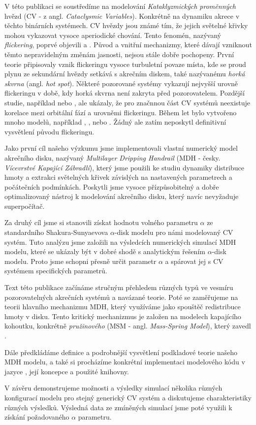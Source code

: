 V této publikaci se soustředíme na modelování \emph{Kataklyzmických proměnných} hvězd (CV - z angl. \emph{Cataclysmic Variables}). Konkrétně na dynamiku akrece v těchto binárních systémech. CV hvězdy jsou známé tím, že jejich světelné křivky mohou vykazovat vysoce aperiodické chování. Tento fenomén, nazývaný \emph{flickering}, poprvé objevili \citep{henize1949} a \citep{lenouvel1954}. Původ a vnitřní mechanizmy, které dávají vzniknout těmto nepravidelným změnám jasnosti, nejsou stále dobře pochopeny. První teorie připisovaly vznik flickeringu vysoce turbuletní povaze místa, kde se proud plynu ze sekundární hvězdy setkává s akrečním diskem, také nazývanému \emph{horká skvrna} (angl. \emph{hot spot}). Některé pozorované systémy vykazují nejvyšší urovně flickeringu v době, kdy horká skvrna není zakryta před pozorovatelem. Pozdější studie, například \citep{patterson1981} nebo \citep{wood1986}, ale ukázaly, že pro značnnou část CV systémů neexistuje  korelace mezi orbitální fází a urovněmi flickeringu. Během let bylo vytvořeno mnoho modelů, například \citep{dobrotka2012}, \citep{kley1997}, \citep{lyubarskii1997} nebo \citep{yonehara1997}. Žádný ale zatím neposkytl definitivní vysvětlení původu flickeringu.

Jako první cíl našeho výzkumu jsme implementovali vlastní numerický model akrečního disku, nazývaný \emph{Multilayer Dripping Handrail} (MDH - česky. \emph{Vícevrstvé Kapající Zábradlí}), který jsme použili ke studiu dynamiky distribuce hmoty a extrakci světelných křivek závislých na nastavených parametrech a počátečních podmínkách. Poskytli jsme vysoce přízpůsobitelný a dobře optimalizovaný nástroj k modelování akrečního disku, který navíc nevyžaduje superpočítač.

Za druhý cíl jsme si stanovili získat hodnotu volného parametru $\alpha$ ze standardního Shakura-Sunyaevova $\alpha$-disk modelu pro námi modelovaný CV systém. Tuto analýzu jsme založili na výsledcích numerických simulací MDH modelu, které se ukázaly být v dobré shodě s analytickým řešením $\alpha$-disk modelu. Proto jsme schopni přesně určit parametr $\alpha$ a spárovat jej s CV systémem specifických parametrů.

Text této publikace začínáme stručným přehledem různých typů ve vesmíru pozorovatelných akrečních systémů a navázané teorie. Poté se zaměřujeme na teorii hlavního mechanizmu MDH, který využíváme jako spouštěč redistribuce hmoty v disku. Tento kritický mechanizmus je založen na modelech kapajícího kohoutku, konkrétně \emph{pružinového} (MSM - angl. \emph{Mass-Spring Model}), který zavedl \citep{shaw1984}.

Dále předkládáme definice a podrobnější vysvětlení podkladové teorie našeho MDH modelu, a také si procházíme konkrétní implementaci modelového kódu v jazyce \CC, její koncepce a použité knihovny. 

V závěru demonstrujeme možnosti a výsledky simulací několika různých konfigurací modelu pro stejný generický CV systém a diskutujeme charakteristiky různých výsledků. Výsledná data ze zmíněných simulací jsme poté využili k získání požadovaného $\alpha$ parametru.
